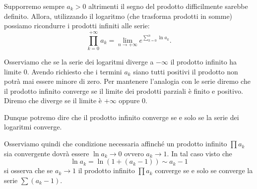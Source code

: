Supporremo sempre $a_k>0$ altrimenti il segno del prodotto difficilmente
sarebbe definito.
Allora, utilizzando il logaritmo (che trasforma prodotti in somme) possiamo
ricondurre i prodotti infiniti
alle serie:
\[
  \prod_{k=0}^{+\infty} a_k = \lim_{n\to +\infty} e^{\sum_{k=0}^n \ln a_k}.
\]

Osserviamo che se la serie dei logaritmi diverge a $-\infty$ il prodotto infinito
ha limite $0$. Avendo richiesto che i termini $a_k$ siano tutti positivi il prodotto
non potrà mai essere minore di zero. Per mantenere l'analogia con le serie diremo
che il prodotto infinito converge se il limite dei prodotti parziali è finito e positivo.
Diremo che diverge se il limite è $+\infty$ oppure $0$.

Dunque potremo dire che il prodotto infinito converge se e solo se la serie dei logaritmi converge.

Osserviamo quindi che condizione necessaria affinché un prodotto infinito
$\prod a_k$ sia convergente
dovrà essere $\ln a_k\to 0$ ovvero $a_k \to 1$. In tal caso visto che
\[
  \ln a_k = \ln (1+(a_k-1)) \sim a_k - 1
\]
si osserva che se $a_k\to 1$ il prodotto infinito $\prod a_k$ converge
se e solo se converge la serie $\sum (a_k-1)$.

